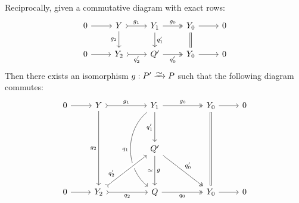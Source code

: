 \begin{theorem}
\begin{enumerate}[(a)]
              Reciprocally, given a commutative diagram with exact rows:
              \[
                  \begin{tikzcd}
                      0 \ar[r]
                      &Y \ar[d, "g_2"']
                      \ar[r, "g_1", tail]
                      &Y_1
                      \ar[r, "g_0", two heads]
                      \ar[d, "q_1'"]
                      &Y_0
                      \ar[d, equals]
                      \ar[r]
                      &0
                      \\
                      0 \ar[r]
                      &Y_2 \ar[r, tail, "q_2'"']
                      &Q' \ar[r, two heads, "q_0'"']
                      &Y_0 \ar[r]
                      &0
                  \end{tikzcd}
              \]
              Then there exists an isomorphism \(g: P' \isoto P\) such that the following
              diagram commutes:
              \[
                  \begin{tikzcd}
                      0
                      \ar[r]
                      &Y
                      \ar[rr, "g_1", tail]
                      \ar[dddd, "g_2"']
                      &
                      &Y_1
                      \ar[rr, "g_0", two heads]
                      \ar[dddd, "q_1"', bend right=50]
                      \ar[dd, "q_1'"']
                      &
                      &Y_0
                      \ar[dddd, equals]
                      \ar[r]
                      &0
                      \\
                      &
                      &
                      &
                      &
                      &
                      &
                      \\
                      &
                      &
                      &Q'
                      \ar[dd, "g", "\dis"']
                      \ar[ddrr, "q_0'", two heads]
                      &
                      &
                      &
                      \\
                      &
                      &
                      &
                      &
                      \\
                      0
                      \ar[r]
                      &Y_2
                      \ar[rr, tail, "q_2"']
                      \ar[rruu, tail, "q_2'", near start, crossing over]
                      &
                      &Q
                      \ar[rr, two heads, "q_0"']
                      &
                      &Y_0
                      \ar[r]
                      &0
                  \end{tikzcd}
              \]
    \end{enumerate}
\end{theorem}

